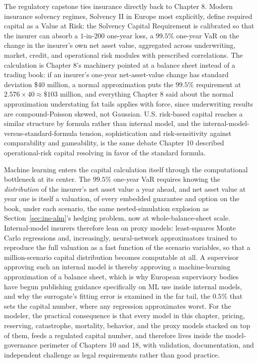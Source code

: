 \documentclass[../ai_in_finance]{subfiles}
\begin{document}
The regulatory capstone ties insurance directly back to Chapter 8. Modern insurance solvency regimes, Solvency II in Europe most explicitly, define required capital as a Value at Risk: the Solvency Capital Requirement is calibrated so that the insurer can absorb a $1$-in-$200$ one-year loss, a $99.5\%$ one-year VaR on the change in the insurer's own net asset value, aggregated across underwriting, market, credit, and operational risk modules with prescribed correlations. The calculation is Chapter 8's machinery pointed at a balance sheet instead of a trading book: if an insurer's one-year net-asset-value change has standard deviation \$40 million, a normal approximation puts the $99.5\%$ requirement at $2.576 \times 40 \approx \$103$ million, and everything Chapter 8 said about the normal approximation understating fat tails applies with force, since underwriting results are compound-Poisson skewed, not Gaussian. U.S. risk-based capital reaches a similar structure by formula rather than internal model, and the internal-model-versus-standard-formula tension, sophistication and risk-sensitivity against comparability and gameability, is the same debate Chapter 10 described operational-risk capital resolving in favor of the standard formula.

Machine learning enters the capital calculation itself through the computational bottleneck at its center. The $99.5\%$ one-year VaR requires knowing the \emph{distribution} of the insurer's net asset value a year ahead, and net asset value at year one is itself a valuation, of every embedded guarantee and option on the book, under each scenario, the same nested-simulation explosion as Section~\ref{sec:ins-alm}'s hedging problem, now at whole-balance-sheet scale. Internal-model insurers therefore lean on proxy models: least-squares Monte Carlo regressions and, increasingly, neural-network approximators trained to reproduce the full valuation as a fast function of the scenario variables, so that a million-scenario capital distribution becomes computable at all. A supervisor approving such an internal model is thereby approving a machine-learning approximation of a balance sheet, which is why European supervisory bodies have begun publishing guidance specifically on ML use inside internal models, and why the surrogate's fitting error is examined in the far tail, the $0.5\%$ that sets the capital number, where any regression approximates worst. For the modeler, the practical consequence is that every model in this chapter, pricing, reserving, catastrophe, mortality, behavior, and the proxy models stacked on top of them, feeds a regulated capital number, and therefore lives inside the model-governance perimeter of Chapters 10 and 18, with validation, documentation, and independent challenge as legal requirements rather than good practice.
\end{document}
